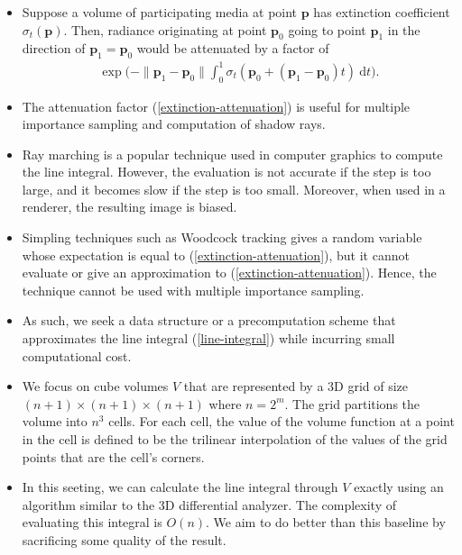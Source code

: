 \documentclass[10pt]{article}
\newcommand{\dee}{\mathrm{d}}
\begin{document}
\begin{itemize}
    \item Suppose a volume of participating media at point $\mathbf{p}$
    has extinction coefficient $\sigma_t(\mathbf{p})$. Then, radiance
    originating at point $\mathbf{p}_0$ going to point $\mathbf{p}_1$
    in the direction of $\mathbf{p}_1 = \mathbf{p}_0$ would be
    attenuated by a factor of 
    \begin{align} \label{extinction-attenuation}
        \exp \bigg( - \| \mathbf{p}_1 - \mathbf{p}_0 \| \int_0^1 \sigma_t(\mathbf{p}_0 + (\mathbf{p}_1 - \mathbf{p}_0)t ) \ \dee t \bigg).
    \end{align}
    
    \item The attenuation factor (\ref{extinction-attenuation})
    is useful for multiple importance sampling and computation
    of shadow rays.
    
    \item Ray marching is a popular technique used in computer graphics
    to compute the line integral. However, the evaluation 
    is not accurate
    if the step is too large, and it becomes slow if the step is too 
    small. Moreover, when used in a renderer, the resulting image 
    is biased. 
    
    \item Simpling techniques such as Woodcock tracking gives
    a random variable whose expectation is equal to 
    (\ref{extinction-attenuation}), but it cannot evaluate
    or give an approximation to (\ref{extinction-attenuation}).
    Hence, the technique cannot be used with multiple importance
    sampling.
    
    \item As such, we seek a data structure or a precomputation
    scheme that approximates the line integral (\ref{line-integral})
    while incurring small computational cost.
    
    \item We focus on cube volumes $V$ that are represented by
        a 3D grid of size $(n+1)\times(n+1)\times(n+1)$
        where $n = 2^m$. The grid partitions the volume
        into $n^3$ cells. For each cell, the value of the
        volume function at a point in the cell is defined
        to be the trilinear interpolation of the values
        of the grid points that are the cell's corners.                        
    \item In this seeting, we can calculate the line integral
        through $V$ exactly using an algorithm similar to
        the 3D differential analyzer. The complexity of evaluating
        this integral is $O(n)$. We aim to do better than this
        baseline by sacrificing some quality of the result.    
\end{itemize}
\end{document}
